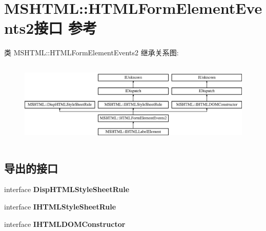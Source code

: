 \hypertarget{interface_m_s_h_t_m_l_1_1_h_t_m_l_form_element_events2}{}\section{M\+S\+H\+T\+ML\+:\+:H\+T\+M\+L\+Form\+Element\+Events2接口 参考}
\label{interface_m_s_h_t_m_l_1_1_h_t_m_l_form_element_events2}
类 M\+S\+H\+T\+ML\+:\+:H\+T\+M\+L\+Form\+Element\+Events2 继承关系图\+:\begin{figure}[H]
\begin{center}
\leavevmode
\includegraphics[height=4.040404cm]{interface_m_s_h_t_m_l_1_1_h_t_m_l_form_element_events2}
\end{center}
\end{figure}
\subsection*{导出的接口}
\begin{DoxyCompactItemize}
\item 
\mbox{\label{interface_m_s_h_t_m_l_1_1_h_t_m_l_form_element_events2_a54b33699c6a698751e04968dd1180b19}} 
interface {\bfseries Disp\+H\+T\+M\+L\+Style\+Sheet\+Rule}
\item 
\mbox{\label{interface_m_s_h_t_m_l_1_1_h_t_m_l_form_element_events2_a053bdd812f6fe1c47bb0df169ababe07}} 
interface {\bfseries I\+H\+T\+M\+L\+Style\+Sheet\+Rule}
\item 
\mbox{\label{interface_m_s_h_t_m_l_1_1_h_t_m_l_form_element_events2_a9ccc715b36a72e018ba421b91fd18e0b}} 
interface {\bfseries I\+H\+T\+M\+L\+D\+O\+M\+Constructor}
\end{DoxyCompactItemize}
